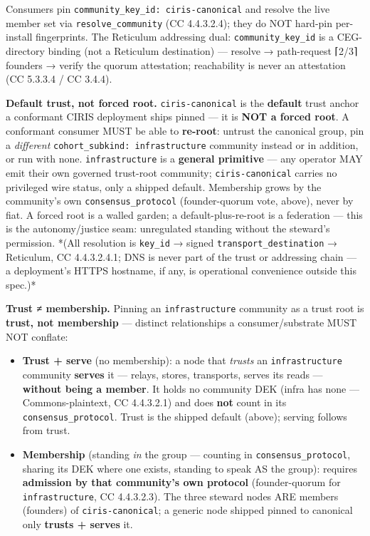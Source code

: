 \documentclass[11pt]{article}
\begin{document}
Consumers pin \texttt{community\_key\_id: ciris-canonical} and resolve the live member set via \texttt{resolve\_community} (CC 4.4.3.2.4); they do NOT hard-pin per-install fingerprints. The Reticulum addressing dual: \texttt{community\_key\_id} is a CEG-directory binding (not a Reticulum destination) — resolve → path-request ⌈2/3⌉ founders → verify the quorum attestation; reachability is never an attestation (CC 5.3.3.4 / CC 3.4.4).


\textbf{Default trust, not forced root.} \texttt{ciris-canonical} is the \textbf{default} trust anchor a conformant CIRIS deployment ships pinned — it is \textbf{NOT a forced root}. A conformant consumer MUST be able to \textbf{re-root}: untrust the canonical group, pin a \textit{different} \texttt{cohort\_subkind: infrastructure} community instead or in addition, or run with none. \texttt{infrastructure} is a \textbf{general primitive} — any operator MAY emit their own governed trust-root community; \texttt{ciris-canonical} carries no privileged wire status, only a shipped default. Membership grows by the community's own \texttt{consensus\_protocol} (founder-quorum vote, above), never by fiat. A forced root is a walled garden; a default-plus-re-root is a federation — this is the autonomy/justice seam: unregulated standing without the steward's permission. *(All resolution is \texttt{key\_id} → signed \texttt{transport\_destination} → Reticulum, CC 4.4.3.2.4.1; DNS is never part of the trust or addressing chain — a deployment's HTTPS hostname, if any, is operational convenience outside this spec.)*


\textbf{Trust ≠ membership.} Pinning an \texttt{infrastructure} community as a trust root is \textbf{trust, not membership} — distinct relationships a consumer/substrate MUST NOT conflate:

\begin{itemize}\setlength\itemsep{0pt}
\item \textbf{Trust + serve} (no membership): a node that \textit{trusts} an \texttt{infrastructure} community \textbf{serves} it — relays, stores, transports, serves its reads — \textbf{without being a member}. It holds no community DEK (infra has none — Commons-plaintext, CC 4.4.3.2.1) and does \textbf{not} count in its \texttt{consensus\_protocol}. Trust is the shipped default (above); serving follows from trust.
\item \textbf{Membership} (standing \textit{in} the group — counting in \texttt{consensus\_protocol}, sharing its DEK where one exists, standing to speak AS the group): requires \textbf{admission by that community's own protocol} (founder-quorum for \texttt{infrastructure}, CC 4.4.3.2.3). The three steward nodes ARE members (founders) of \texttt{ciris-canonical}; a generic node shipped pinned to canonical only \textbf{trusts + serves} it.
\end{itemize}
\end{document}
